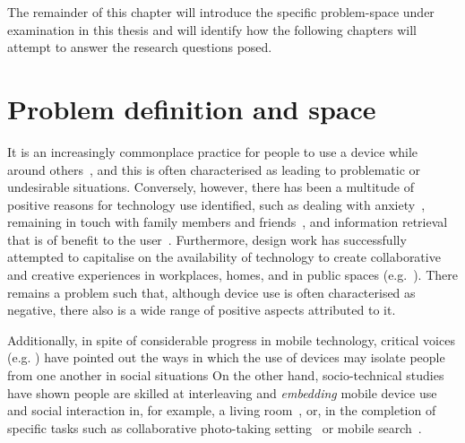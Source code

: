 The remainder of this chapter will introduce the specific problem-space under examination in this thesis and will identify how the following chapters will attempt to answer the research questions posed.






\section{Problem definition and space}\label{sec:intro probdef}
It is an increasingly commonplace practice for people to use a device while around others~\citep{Brown2014}, and this is often characterised as leading to problematic or undesirable situations.
Conversely, however, there has been a multitude of positive reasons for technology use identified, such as dealing with anxiety~\citep{Wei2006}, remaining in touch with family members and friends~\citep{Harmon2013}, and information retrieval that is of benefit to the user~\citep{Sohn2008}.
Furthermore, design work has successfully attempted to capitalise on the availability of technology to create collaborative and creative experiences in workplaces, homes, and in public spaces (e.g.~\citet{Fatahgen.Schieck2014c}).
There remains a problem such that, although device use is often characterised as negative, there also is a wide range of positive aspects attributed to it.

Additionally, in spite of considerable progress in mobile technology, critical voices (e.g. \citet{Su2015, Turkle2011}) have pointed out the ways in which the use of devices may isolate people from one another in social situations
On the other hand, socio-technical studies have shown people are skilled at interleaving and \textit{embedding} mobile device use and social interaction in, for example, a living room~\citep{Rooksby2015}, or, in the completion of specific tasks such as collaborative photo-taking setting~\citep{Durrant2011} or mobile search~\citep{Brown2015}.


